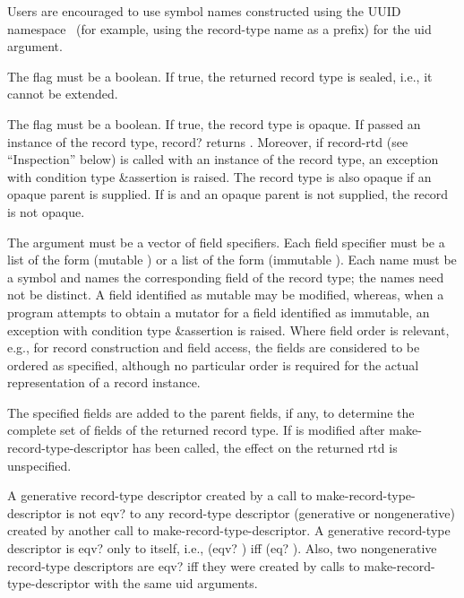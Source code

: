 \begin{entry}{%
}
\begin{note}   
  Users are encouraged to use symbol names
  constructed using the UUID namespace~\cite{RFC4122} (for example, using the
  record-type name as a prefix) for the uid argument.
\end{note}

The  flag must be a boolean. If true, the returned record type
is sealed, i.e., it cannot be extended.

The  flag must be a boolean. If true, the record type
is opaque.
If passed an instance of the record type,
{\cf record?} returns
\schfalse{}.  Moreover, if {\cf record-rtd} (see ``Inspection'' below)
is called with an instance of the record type, 
an exception with condition type {\cf\&assertion} is raised.
The record type is also opaque if an opaque parent is
supplied.  If  is \schfalse{} and an opaque parent is not
supplied, the record is not opaque.

The  argument must be a vector of field specifiers. Each
field specifier must be a list of the form {\cf (mutable )}
or a list of the form {\cf (immutable )}.
Each name must be a symbol and names the corresponding field of the record
type; the names need not be distinct.  A field identified as mutable may
be modified, whereas, when a program attempts to obtain a mutator for a field identified
as immutable, an exception with condition type {\cf\&assertion} is raised.
Where field order is relevant, e.g., for record construction and field
access, the fields are considered to be ordered as specified, although
no particular order is required for the actual representation of a
record instance.

The specified fields are added to the parent fields, if any, to determine
the complete set of fields of the returned record type.
If  is modified after {\cf make-record-type-descriptor}
has been called, the effect on the returned
rtd is unspecified.

A generative record-type descriptor created by a call to {\cf
  make-record-type-descriptor} is not {\cf eqv?} to any record-type
descriptor (generative or nongenerative) created by another call to
{\cf make-record-type-descriptor}. A generative record-type descriptor
is {\cf eqv?}  only to itself, i.e., {\cf (eqv?  )} iff
{\cf (eq?  )}.
Also, two nongenerative record-type descriptors are {\cf eqv?} iff they were
created by calls to {\cf make-record-type-descriptor} with the same
uid arguments.
\end{entry}

